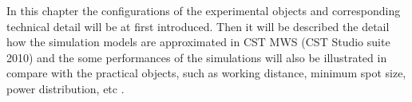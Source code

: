 
In this chapter the configurations of the experimental objects and corresponding technical detail will be at first introduced. Then it will be described the detail how the simulation models are approximated in CST MWS (CST Studio suite 2010) and the some performances of the simulations will also be illustrated in compare with the practical objects, such as working distance, minimum spot size, power distribution, etc .

